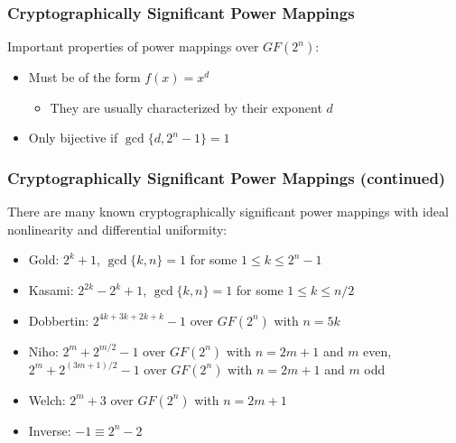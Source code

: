 \documentclass[10pt]{beamer}
\begin{document}
\begin{frame}
	\frametitle{Cryptographically Significant Power Mappings}
	Important properties of power mappings over $GF(2^n)$:
	\begin{itemize}
		\item Must be of the form $f(x) = x^d$
		\begin{itemize}
			\item They are usually characterized by their exponent $d$
		\end{itemize}
		\item Only bijective if $\gcd\{d, 2^n - 1\} = 1$
	\end{itemize}
\end{frame}

\begin{frame}
	\frametitle{Cryptographically Significant Power Mappings (continued)}
	There are many known cryptographically significant power mappings with ideal nonlinearity and differential uniformity:
	\begin{itemize}
		\item Gold: $2^{k} + 1$, $\gcd\{k,n\} = 1$ for some $1 \leq k \leq 2^{n} - 1$
		\item Kasami: $2^{2k} - 2^k + 1$, $\gcd\{k,n\} = 1$ for some $1 \leq k \leq n/2$
		\item Dobbertin: $2^{4k + 3k + 2k + k} - 1$ over $GF(2^n)$ with $n = 5k$
		\item Niho: $2^{m} + 2^{m/2} - 1$ over $GF(2^n)$ with $n = 2m + 1$ and $m$ even, $2^{m} + 2^{(3m + 1)/2} - 1$ over $GF(2^n)$ with $n = 2m + 1$ and $m$ odd
		\item Welch: $2^m + 3$ over $GF(2^n)$ with $n = 2m + 1$
		\item Inverse: $-1 \equiv 2^n - 2$
	\end{itemize}
\end{frame}

\end{document}
